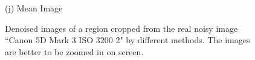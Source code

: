 \documentclass[10pt,onecolumn,letterpaper]{article}
\begin{document}
\begin{figure}[H]
{\begin{minipage}[t]{0.195\textwidth}
{\footnotesize (j) Mean Image \cite{crosschannel2016}}
\end{minipage}
}
\caption{Denoised images of a region cropped from the real noisy image ``Canon 5D Mark 3 ISO 3200 2" \cite{crosschannel2016} by different methods. The images are better to be zoomed in on screen.}
\label{fig5}
\end{figure}

\begin{figure}[H]\vspace{1mm}
\centering
{}
\end{figure}
\end{document}
